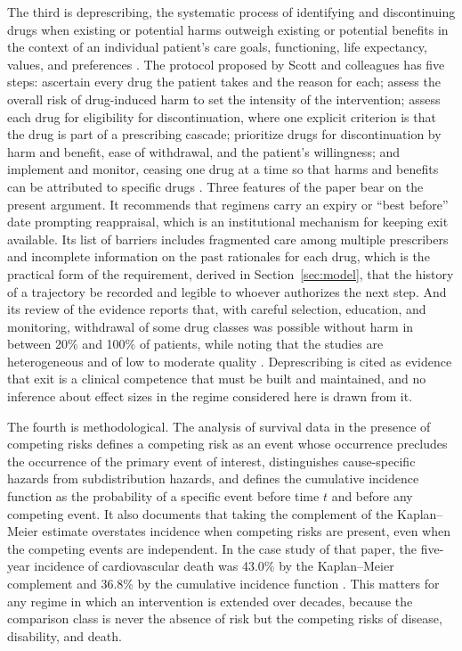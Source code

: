 \documentclass[11pt]{article}
\theoremstyle{plain}
\theoremstyle{definition}
\theoremstyle{remark}
\begin{document}
The third is deprescribing, the systematic process of identifying and discontinuing drugs when existing or potential harms outweigh existing or potential benefits in the context of an individual patient's care goals, functioning, life expectancy, values, and preferences \cite{scott2015}. The protocol proposed by Scott and colleagues has five steps: ascertain every drug the patient takes and the reason for each; assess the overall risk of drug-induced harm to set the intensity of the intervention; assess each drug for eligibility for discontinuation, where one explicit criterion is that the drug is part of a prescribing cascade; prioritize drugs for discontinuation by harm and benefit, ease of withdrawal, and the patient's willingness; and implement and monitor, ceasing one drug at a time so that harms and benefits can be attributed to specific drugs \cite{scott2015}. Three features of the paper bear on the present argument. It recommends that regimens carry an expiry or ``best before'' date prompting reappraisal, which is an institutional mechanism for keeping exit available. Its list of barriers includes fragmented care among multiple prescribers and incomplete information on the past rationales for each drug, which is the practical form of the requirement, derived in Section~\ref{sec:model}, that the history of a trajectory be recorded and legible to whoever authorizes the next step. And its review of the evidence reports that, with careful selection, education, and monitoring, withdrawal of some drug classes was possible without harm in between 20\% and 100\% of patients, while noting that the studies are heterogeneous and of low to moderate quality \cite{scott2015}. Deprescribing is cited as evidence that exit is a clinical competence that must be built and maintained, and no inference about effect sizes in the regime considered here is drawn from it.

The fourth is methodological. The analysis of survival data in the presence of competing risks defines a competing risk as an event whose occurrence precludes the occurrence of the primary event of interest, distinguishes cause-specific hazards from subdistribution hazards, and defines the cumulative incidence function as the probability of a specific event before time $t$ and before any competing event. It also documents that taking the complement of the Kaplan--Meier estimate overstates incidence when competing risks are present, even when the competing events are independent. In the case study of that paper, the five-year incidence of cardiovascular death was 43.0\% by the Kaplan--Meier complement and 36.8\% by the cumulative incidence function \cite{austin2016}. This matters for any regime in which an intervention is extended over decades, because the comparison class is never the absence of risk but the competing risks of disease, disability, and death.
\end{document}
